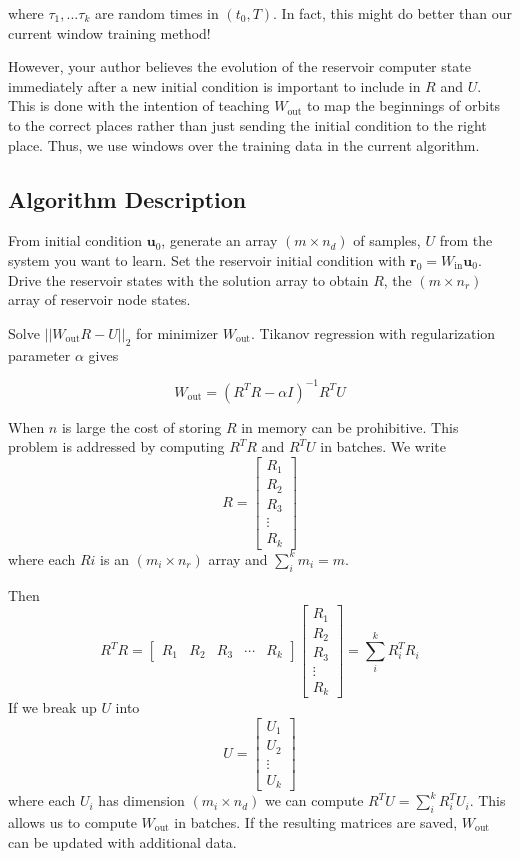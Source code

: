 \documentclass{article}
\begin{document}
where $\tau_1, ... \tau_k$ are random times in $(t_0, T)$. In fact, this might do better than our current window training method!

However, your author believes the evolution of the reservoir computer state immediately after a new initial condition is important to include in $R$ and $U$. This is done with the intention of teaching $W_\text{out}$ to map the beginnings of orbits to the correct places rather than just sending the initial condition to the right place. Thus, we use windows over the training data in the current algorithm.

\subsection*{Algorithm Description}
From initial condition $\mathbf{u}_0$, generate an array $(m \times n_d)$ of samples, $U$ from the system you want to learn.
Set the reservoir initial condition with $\mathbf{r}_0=W_\text{in} \mathbf{u}_0$. Drive the reservoir states with the solution array to obtain $R$, the $(m \times n_r)$ array of reservoir node states.

Solve $||W_\text{out} R - U||_2$ for minimizer $W_\text{out}$. Tikanov regression with regularization parameter  $\alpha$ gives

\[
W_\text{out} = (R^TR - \alpha I)^{-1} R^T U
\]

When $n$ is large the cost of storing $R$ in memory can be prohibitive. This problem is addressed by computing $R^TR$ and $R^TU$ in batches. We write
\[
R = \begin{bmatrix}
R_1 \\
R_2\\
R_3 \\
\vdots  \\
R_k
\end{bmatrix}  
\]
where each $Ri$ is an $(m_i \times n_r)$ array and $\sum_i^k m_i = m$.

Then 
\[
R^TR = 
\begin{bmatrix}
R_1 &  R_2 & R_3 & \cdots & R_k
\end{bmatrix}  
\begin{bmatrix}
R_1 \\ 
R_2\\
R_3 \\
\vdots \\ 
R_k
\end{bmatrix}  = \sum_i^k R_i^T R_i
\]
If we break up $U$ into 
\[
U = 
\begin{bmatrix}
U_1 \\ U_2 \\  \vdots \\ U_k
\end{bmatrix} 
\]where each $U_i$ has dimension $(m_i \times n_d)$ we can compute $R^TU = \sum_i^k R_i^T U_i$. This allows us to compute $W_\text{out}$ in batches. If the resulting matrices are saved, $W_\text{out}$ can be updated with additional data.
\end{document}
